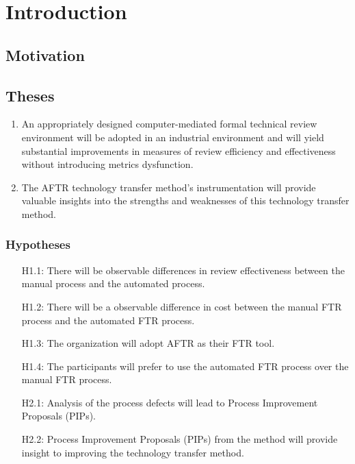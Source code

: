 
\section{Introduction}
\label{sec:intro}

\subsection{Motivation}

\subsection{Theses}
\begin{enumerate}
\item {An appropriately designed computer-mediated formal technical review
    environment will be adopted in an industrial environment and will yield
    substantial improvements in measures of review efficiency and
    effectiveness without introducing metrics dysfunction.}

\item {The AFTR technology transfer method's instrumentation will provide valuable
    insights into the strengths and weaknesses of this technology transfer
    method.}

\end{enumerate}

\subsubsection{Hypotheses}
\begin{enumerate}
\item[H1.1:]{There will be observable differences in review
effectiveness between the manual process and the automated process.}
\item[H1.2:]{There will be a observable difference in cost between
the manual FTR process and the automated FTR process.}
\item[H1.3:]{The organization will adopt AFTR as their FTR tool.}
\item[H1.4:]{The participants will prefer to use the automated FTR
process over the manual FTR process.}
\item[H2.1:]{Analysis of the process defects will lead to Process
Improvement Proposals (PIPs).}
\item[H2.2:]{Process Improvement Proposals (PIPs) from the method will
provide insight to improving the technology transfer method.}
\end{enumerate}

